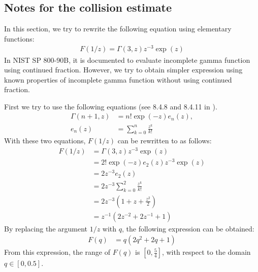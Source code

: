 ﻿\documentclass[a3paper,xelatex,english]{bxjsarticle}
\begin{document}
\clearpage
\subsection{Notes for the collision estimate}
In this section, we try to rewrite the following equation using elementary functions:
\begin{align}
F(1/z) = \Gamma(3,z)z^{-3}\exp(z) 
\label{eq:Fin632}
\end{align}
In NIST SP 800-90B\cite{SP80090B}, it is documented to evaluate incomplete gamma function using continued fraction.
However, we try to obtain simpler expression using known properties of incomplete gamma function without using continued fraction.

First we try to use the following equations (see 8.4.8 and 8.4.11 in \cite{MathHandbook}).
\begin{align}
\Gamma(n + 1, z) &= n!\exp(-z) e_{n}(z), \\
e_{n}(z) &= \sum_{k = 0}^{n}\frac{z^{k}}{k!}
\end{align}
With these two equations, $F(1/z)$ can be rewritten to as follows:
\begin{align}
F(1/z) &= \Gamma(3,z)z^{-3}\exp(z) \nonumber \\
&= 2!\exp(-z) e_{2}(z) z^{-3} \exp(z) \nonumber \\
&= 2 z^{-3} e_{2}(z) \nonumber \\
&= 2 z^{-3} \sum_{k = 0}^{2}\frac{z^{k}}{k!} \nonumber \\
&= 2 z^{-3} \left( 1 + z + \frac{z^{2}}{2} \right) \nonumber \\
&= z^{-1} \left( 2z^{-2} + 2z^{-1} + 1 \right) 
\label{eq:rewFin632}
\end{align}
By replacing the argument $1/z$ with $q$, the following expression can be obtained:
\begin{align}
F(q) &= q \left( 2q^{2} + 2q + 1 \right) \label{eq:rewFin632final}
\end{align}
From this expression, the range of $F(q)$ is $[0, \frac{5}{4}]$, with respect to the domain $q \in [0, 0.5]$.
\end{document}
